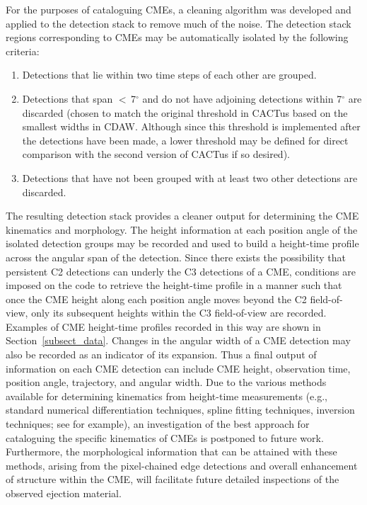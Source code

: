 \documentclass[preprint2]{aastex}
\begin{document}
For the purposes of cataloguing CMEs, a cleaning algorithm was developed and applied to the detection stack to remove much of the noise. The detection stack regions corresponding to CMEs may be automatically isolated by the following criteria:
\begin{enumerate}
\item Detections that lie within two time steps of each other are grouped.
\item Detections that span $<$\,7$^{\circ}$ and do not have adjoining detections within 7$^{\circ}$ are discarded (chosen to match the original threshold in CACTus based on the smallest widths in CDAW. Although since this threshold is implemented after the detections have been made, a lower threshold may be defined for direct comparison with the second version of CACTus if so desired).
\item Detections that have not been grouped with at least two other detections are discarded.
\end{enumerate}
The resulting detection stack provides a cleaner output for determining the CME kinematics and morphology. The height information at each position angle of the isolated detection groups may be recorded and used to build a height-time profile across the angular span of the detection. Since there exists the possibility that persistent C2 detections can underly the C3 detections of a CME, conditions are imposed on the code to retrieve the height-time profile in a manner such that once the CME height along each position angle moves beyond the C2 field-of-view, only its subsequent heights within the C3 field-of-view are recorded. Examples of CME height-time profiles recorded in this way are shown in Section~\ref{subsect_data}. Changes in the angular width of a CME detection may also be recorded as an indicator of its expansion. Thus a final output of information on each CME detection can include CME height, observation time, position angle, trajectory, and angular width. Due to the various methods available for determining kinematics from height-time measurements (e.g., standard numerical differentiation techniques, spline fitting techniques, inversion techniques; see \citealt{2010ApJ...712.1410T} for example), an investigation of the best approach for cataloguing the specific kinematics of CMEs is postponed to future work. Furthermore, the morphological information that can be attained with these methods, arising from the pixel-chained edge detections and overall enhancement of structure within the CME, will facilitate future detailed inspections of the observed ejection material.
\end{document}
